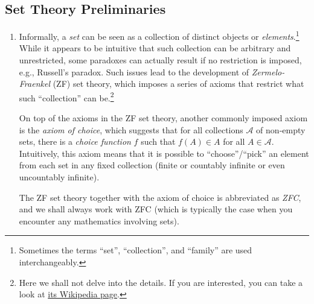 \subsection{Set Theory Preliminaries}
\begin{enumerate}
\item Informally, a \emph{set} can be seen as a collection of distinct objects
or \emph{elements}.\footnote{Sometimes the terms ``set'', ``collection'', and
``family'' are used interchangeably.} While it appears to be intuitive that
such collection can be arbitrary and unrestricted, some paradoxes can actually
result if no restriction is imposed, e.g., Russell's paradox. Such issues lead
to the development of \emph{Zermelo-Fraenkel} (ZF) set theory, which imposes a
series of axioms that restrict what such ``collection'' can be.\footnote{Here
we shall not delve into the details. If you are interested, you can take a look
at
\href{https://en.wikipedia.org/wiki/Zermelo\%E2\%80\%93Fraenkel_set_theory}{its
Wikipedia page}.}

On top of the axioms in the ZF set theory, another commonly imposed axiom is
the \emph{axiom of choice}, which suggests that for all collections
\(\mathcal{A}\) of non-empty sets, there is a \emph{choice function} \(f\) such
that \(f(A)\in A\) for all \(A\in\mathcal{A}\). Intuitively, this axiom means
that it is possible to ``choose''/``pick'' an element from each set in any
fixed collection (finite or countably infinite or even uncountably infinite).

The ZF set theory together with the axiom of choice is abbreviated as
\emph{ZFC}, and we shall always work with ZFC (which is typically the case when
you encounter any mathematics involving sets).


\end{enumerate}
